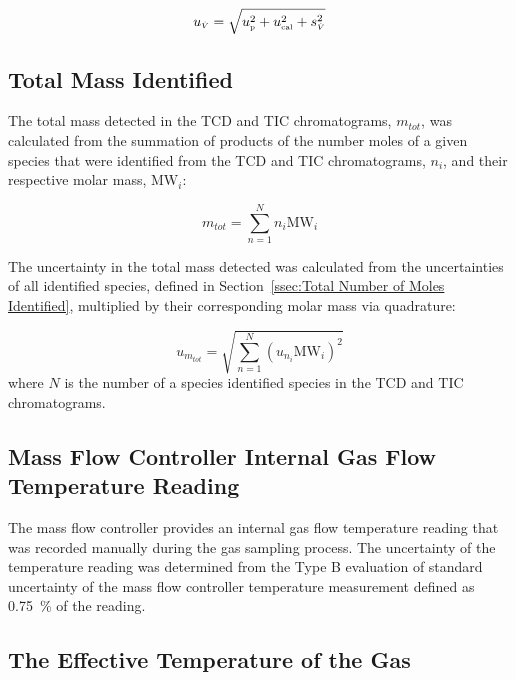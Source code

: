 \documentclass[12pt]{article}
\begin{document}
\begin{equation}
\label{eq:volumetric_flow_uncertainty}
u_{\scriptscriptstyle \dot{V}} = \sqrt{u_{\rm \scriptscriptstyle p}^2 + u_{\rm \scriptscriptstyle cal}^2 + s_{\scriptscriptstyle \dot{V}}^2}
\end{equation}

\subsection{Total Mass Identified}
\label{ssec:Total_Mass_Identified_into_GC/MSD}
The total mass detected in the TCD and TIC chromatograms, $m_{tot}$, was calculated from the summation of products of the number moles of a given species that were identified from the TCD and TIC chromatograms, $n_{i}$, and their respective molar mass, ${\textrm{MW}_{i}}$:

\begin{equation}
\label{eq:total_mass_detected_uncertainty}
m_{tot}=\sum_{n=1}^{N} n_{i}{\textrm{MW}_{i}}
\end{equation}

The uncertainty in the total mass detected was calculated from the uncertainties of all identified species, defined in Section~\ref{ssec:Total Number of Moles Identified}, multiplied by their corresponding molar mass via quadrature:

\begin{equation}
\label{eq:total_mass_detected_uncertainty}
u_{\scriptscriptstyle m_{tot}}=\sqrt{{\sum_{n=1}^{N} (u_{\scriptscriptstyle n_{i}}{\textrm{MW}_{i}})^2}}
\end{equation}
where $N$ is the number of a species identified species in the TCD and TIC chromatograms.

\subsection{Mass Flow Controller Internal Gas Flow Temperature Reading}
\label{ssec:MFC_Temp}

The mass flow controller provides an internal gas flow temperature reading that was recorded manually during the gas sampling process. The uncertainty of the temperature reading was determined from the Type B evaluation of standard uncertainty of the mass flow controller temperature measurement defined as 0.75~\% of the reading.

\subsection{The Effective Temperature of the Gas}
\label{ssec:Probe_Temp}
\end{document}
